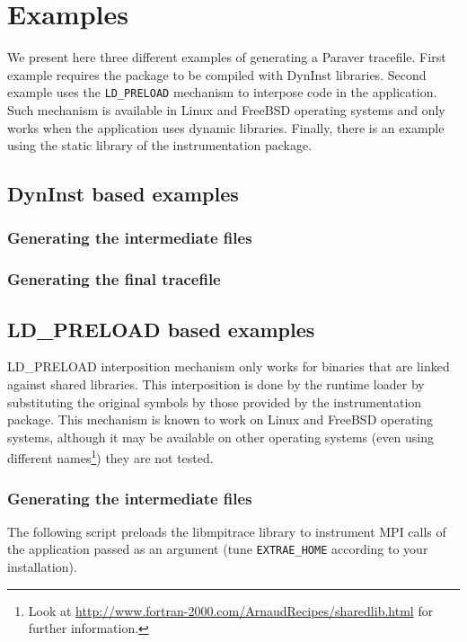 \chapter{Examples}

We present here three different examples of generating a Paraver tracefile. First example requires the package to be compiled with DynInst libraries. Second example uses the {\tt LD\_PRELOAD} mechanism to interpose code in the application. Such mechanism is available in Linux and FreeBSD operating systems and only works when the application uses dynamic libraries. Finally, there is an example using the static library of the instrumentation package.

\section{DynInst based examples}

\subsection{Generating the intermediate files}

\subsection{Generating the final tracefile}

\section{LD\_PRELOAD based examples}

LD\_PRELOAD interposition mechanism only works for binaries that are linked against shared libraries. This interposition is done by the runtime loader by substituting the original symbols by those provided by the instrumentation package. This mechanism is known to work on Linux and FreeBSD operating systems, although it may be available on other operating systems (even using different names\footnote{Look at \url{http://www.fortran-2000.com/ArnaudRecipes/sharedlib.html} for further information.}) they are not tested.

\subsection{Generating the intermediate files}

The following script preloads the libmpitrace library to instrument MPI calls of the application passed as an argument (tune {\tt EXTRAE\_HOME} according to your installation).

